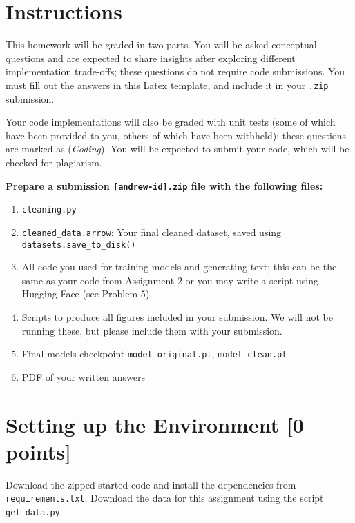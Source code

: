 \documentclass[leqno,12pt]{article}
\begin{document}
\section*{Instructions}
\noindent 
This homework will be graded in two parts. 
You will be asked conceptual questions and are expected to share insights after exploring different implementation trade-offs; these questions do not require code submissions. You must fill out the answers in this Latex template, and include it in your \texttt{.zip} submission. \newline

\noindent Your code implementations will also be graded with unit tests (some of which have been provided to you, others of which have been withheld); these questions are marked as (\emph{Coding}). You will be expected to submit your code, which will be checked for plagiarism. \newline

\newpage
\noindent \textbf{Prepare a submission \texttt{[andrew-id].zip} file with the following files:}

\begin{enumerate}
    \item \texttt{cleaning.py}
    \item \texttt{cleaned\_data.arrow}: Your final cleaned dataset, saved using \texttt{datasets.save\_to\_disk()}
    \item All code you used for training models and generating text; this can be the same as your code from Assignment 2 or you may write a script using Hugging Face (see Problem 5). 
    \item Scripts to produce all figures included in your submission. We will not be running these, but please include them with your submission. 
    \item Final models checkpoint \texttt{model-original.pt}, \texttt{model-clean.pt}
    \item PDF of your written answers
\end{enumerate}


\newpage
\section*{Setting up the Environment [0 points]}

\noindent Download the zipped started code and install the dependencies from \texttt{requirements.txt}. Download the data for this assignment using the script \texttt{get\_data.py}. 
\end{document}
